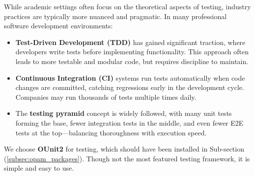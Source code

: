     \begin{Tip} While academic settings often focus on the theoretical aspects of testing, industry practices are typically more nuanced and pragmatic. In many professional software development environments:

        \begin{itemize}
            \item \textbf{Test-Driven Development (TDD)} has gained significant traction, where developers write tests before implementing functionality. This approach often leads to more testable and modular code, but requires discipline to maintain.
            
            \item \textbf{Continuous Integration (CI)} systems run tests automatically when code changes are committed, catching regressions early in the development cycle. Companies may run thousands of tests multiple times daily.
            
            \item The \textbf{testing pyramid} concept is widely followed, with many unit tests forming the base, fewer integration tests in the middle, and even fewer E2E tests at the top—balancing thoroughness with execution speed.
    \end{itemize}
    \end{Tip}
 
    \newpage

    \noindent
    We choose \textbf{OUnit2} for testing, which should have been installed in Sub-section (\ref{subsec:opam_packages}).
    Though not the most featured testing framework, it is simple and easy to use.

